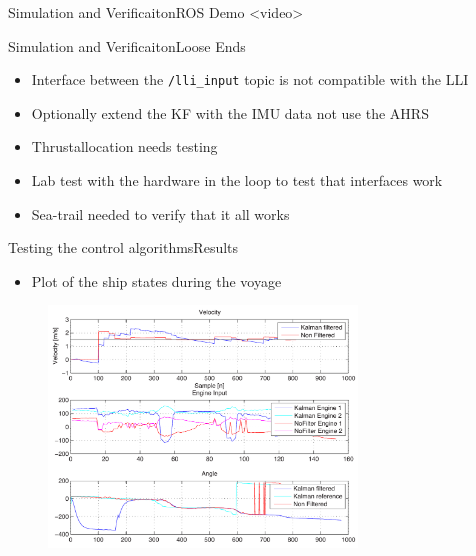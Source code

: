 \documentclass[10pt,handout]{beamer}
\begin{document}
\begin{frame}{Simulation and Verificaiton}{ROS Demo}
<video>
\end{frame}

\begin{frame}{Simulation and Verificaiton}{Loose Ends}
\begin{itemize}
  \item Interface between the \texttt{/lli\_input} topic is not compatible with the LLI
  \item Optionally extend the KF with the IMU data not use the AHRS
  \item Thrustallocation needs testing
  \item Lab test with the hardware in the loop to test that interfaces work
  \item Sea-trail needed to verify that it all works
\end{itemize}
\end{frame}


\begin{frame}{Testing the control algorithms}{Results}
  \begin{itemize}
  \item Plot of the ship states during the voyage
  \end{itemize}
  \begin{figure}
    \begin{center}
      \includegraphics[width=8.2cm]{img/states}
      \label{fig:controltest3}
    \end{center}
  \end{figure}
\end{frame}

\end{document}
